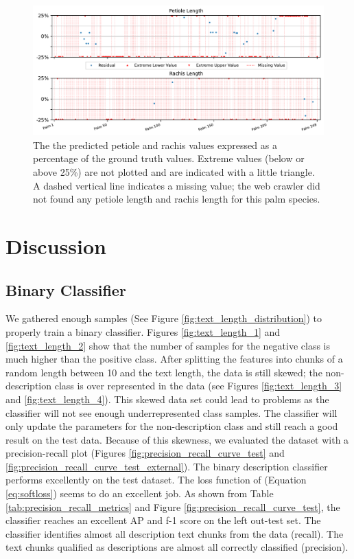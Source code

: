 \documentclass[a4paper, 12pt, oneside]{book} %
\begin{document}
\begin{figure}[htpb]
    \centering
    \includegraphics[width=1\textwidth]{figures/petioleANDrachis_values.pdf}
    \caption[Petiole and rachis values ground truth vs predicted]{The the predicted petiole and rachis values expressed as a percentage of the ground truth values. Extreme values (below or above 25\%) are not plotted and are indicated with a little triangle. A dashed vertical line indicates a missing value; the web crawler did not found any petiole length and rachis length for this palm species.}
    \label{fig:petioleANDrachis_values}
\end{figure}

\newpage
\section{Discussion} \label{par:discussion}

\subsection{Binary Classifier}
We gathered enough samples (See Figure \ref{fig:text_length_distribution}) to properly train a binary classifier.
Figures \ref{fig:text_length_1} and \ref{fig:text_length_2} show that the number of samples for the negative class is much higher than the positive class. 
After splitting the features into chunks of a random length between 10 and the text length, the data is still skewed; the non-description class is over represented in the data (see Figures \ref{fig:text_length_3} and \ref{fig:text_length_4}). 
This skewed data set could lead to problems as the classifier will not see enough underrepresented class samples.
The classifier will only update the parameters for the non-description class and still reach a good result on the test data.
Because of this skewness, we evaluated the dataset with a precision-recall plot (Figures \ref{fig:precision_recall_curve_test} and \ref{fig:precision_recall_curve_test_external}).
The binary description classifier performs excellently on the test dataset. 
The loss function of \textcite{reed_training_2015} (Equation \ref{eq:softloss}) seems to do an excellent job.
As shown from Table \ref{tab:precision_recall_metrics} and Figure \ref{fig:precision_recall_curve_test}, the classifier reaches an excellent AP and f-1 score on the left out-test set.
The classifier identifies almost all description text chunks from the data (recall).
The text chunks qualified as descriptions are almost all correctly classified (precision).
\end{document}

